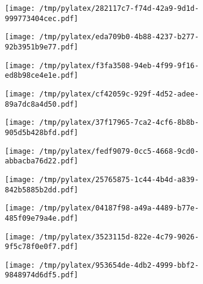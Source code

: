 \documentclass{article}
\begin{document}
\begin{figure}[htbp]
\begin{subfigure}[b]{.3\linewidth}
\texttt{[image: /tmp/pylatex/282117c7-f74d-42a9-9d1d-999773404cec.pdf]}
\end{subfigure}
\begin{subfigure}[b]{.3\linewidth}
\texttt{[image: /tmp/pylatex/eda709b0-4b88-4237-b277-92b3951b9e77.pdf]}
\end{subfigure}
\begin{subfigure}[b]{.3\linewidth}
\texttt{[image: /tmp/pylatex/f3fa3508-94eb-4f99-9f16-ed8b98ce4e1e.pdf]}
\end{subfigure}
\begin{subfigure}[b]{.3\linewidth}
\texttt{[image: /tmp/pylatex/cf42059c-929f-4d52-adee-89a7dc8a4d50.pdf]}
\end{subfigure}
\begin{subfigure}[b]{.3\linewidth}
\texttt{[image: /tmp/pylatex/37f17965-7ca2-4cf6-8b8b-905d5b428bfd.pdf]}
\end{subfigure}
\begin{subfigure}[b]{.3\linewidth}
\texttt{[image: /tmp/pylatex/fedf9079-0cc5-4668-9cd0-abbacba76d22.pdf]}
\end{subfigure}
\begin{subfigure}[b]{.3\linewidth}
\texttt{[image: /tmp/pylatex/25765875-1c44-4b4d-a839-842b5885b2dd.pdf]}
\end{subfigure}
\begin{subfigure}[b]{.3\linewidth}
\texttt{[image: /tmp/pylatex/04187f98-a49a-4489-b77e-485f09e79a4e.pdf]}
\end{subfigure}
\begin{subfigure}[b]{.3\linewidth}
\texttt{[image: /tmp/pylatex/3523115d-822e-4c79-9026-9f5c78f0e0f7.pdf]}
\end{subfigure}
\begin{subfigure}[b]{.3\linewidth}
\texttt{[image: /tmp/pylatex/953654de-4db2-4999-bbf2-9848974d6df5.pdf]}
\end{subfigure}
\end{figure}
\end{document}
